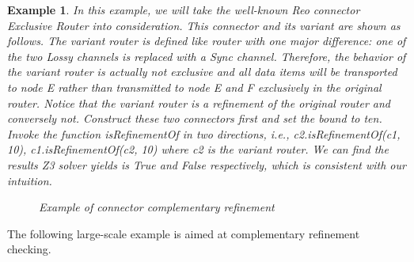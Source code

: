 \documentclass[3p,times]{elsarticle}
\newtheorem{example}{Example}[section]
\begin{document}
\begin{example}
In this example, we will take the well-known Reo connector \emph{Exclusive Router} into consideration. This connector and its variant are shown as follows. The \emph{variant router} is defined like \emph{router} with one major difference: one of the two \emph{Lossy} channels is replaced with a \emph{Sync} channel. Therefore, the behavior of the variant router is actually not exclusive and all data items will be transported to node \emph{E} rather than transmitted to node \emph{E} and \emph{F} exclusively in the original router. Notice that the variant router is a refinement of the original router and conversely not. Construct these two connectors first and set the bound to ten. Invoke the function \emph{isRefinementOf} in two directions, i.e., \emph{c2.isRefinementOf(c1, 10), c1.isRefinementOf(c2, 10)} where \emph{c2} is the variant router. We can find the results Z3 solver yields is \emph{True} and \emph{False} respectively, which is consistent with our intuition.
\begin{figure}
\centering
{}
\caption{Example of connector complementary refinement }
\end{figure}


\end{example}
The following large-scale example is aimed at complementary refinement checking.
\end{document}
